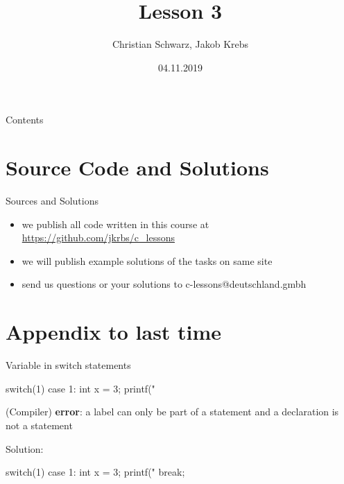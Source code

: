 \documentclass[10pt,graphics,aspectratio=169,table]{beamer}
\title{Lesson 3}
\author{Christian Schwarz, Jakob Krebs}
\date{04.11.2019}
\begin{document}
\maketitle

\begin{frame}{Contents}
    \tableofcontents
\end{frame}


\section{Source Code and Solutions}
\begin{frame}{Sources and Solutions}
    \begin{itemize}
        \item we publish all code written in this course at \url{https://github.com/jkrbs/c_lessons}
        \item we will publish example solutions of the tasks on same site
        \item send us questions or your solutions to c-lessons@deutschland.gmbh
    \end{itemize}
\end{frame}

\section{Appendix to last time}

\begin{frame}[fragile]{Variable in switch statements}
    \begin{codeblock}
switch(1){
    case 1: 
        int x = 3;
        printf("%
}
    \end{codeblock}

    (Compiler) \textbf{error}: a label can only be part of a statement and a 
       declaration is not a statement
   
    Solution:
    \begin{codeblock}
switch(1){
    case 1:{ 
        int x = 3;
        printf("%
    } break;
}
    \end{codeblock}

\end{frame}
\end{document}
